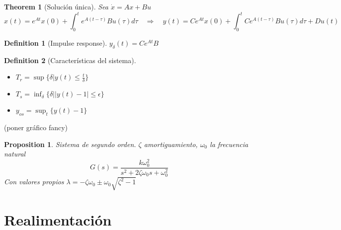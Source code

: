 \documentclass[leqno]{article}
\newtheorem*{theorem}{Theorem}
\newtheorem*{proposition}{Proposition}
\newtheorem*{definition}{Definition}
\begin{document}
\begin{theorem}[Solución única] Sea $\dot{x} = Ax + Bu$ 
  \[
 x(t) = e^{At}x(0) + \int_0^t e^{A(t-\tau )}Bu(\tau )d\tau \quad  \Rightarrow \quad
 y(t) = Ce^{At}x(0) + \int_0^t Ce^{A(t-\tau )}Bu(\tau )d\tau + Du(t)
  \] 
\end{theorem}

\begin{definition}[Impulse response] $y_\delta(t) = Ce^{At}B$

\end{definition}

\begin{definition}[Características del sistema]
  \begin{itemize}[topsep=-6pt, itemsep=0pt]
	\item $T_r = \sup \{\delta | y(t)\le \frac{t}{\delta}\}$ 
	\item $T_s=\inf_{\delta} \{\delta| |y(t)-1|\le \epsilon \}$ 
	\item $y_{os}= \sup_t\{y(t)-1\}$
  \end{itemize}
\end{definition}

(poner gráfico fancy)

\begin{proposition}
Sistema de segundo orden. $\zeta$ amortiguamiento, $\omega _0$ la frecuencia natural
\[
G(s)=\frac{k\omega _0^2}{s^2+2\zeta \omega _0 s + \omega _{0}^2}
\] 
Con valores propios $\lambda= -\zeta \omega _0 \pm \omega _0\sqrt{\zeta^2-1} $
\end{proposition}

\section{Realimentación}
\end{document}
